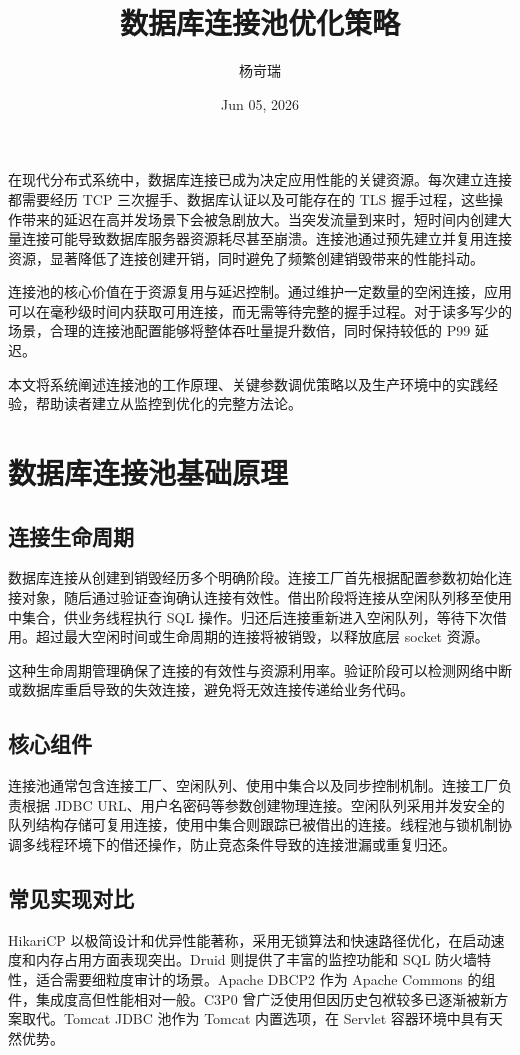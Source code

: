 \title{数据库连接池优化策略}
\author{杨岢瑞}
\date{Jun 05, 2026}
\maketitle
在现代分布式系统中，数据库连接已成为决定应用性能的关键资源。每次建立连接都需要经历 TCP 三次握手、数据库认证以及可能存在的 TLS 握手过程，这些操作带来的延迟在高并发场景下会被急剧放大。当突发流量到来时，短时间内创建大量连接可能导致数据库服务器资源耗尽甚至崩溃。连接池通过预先建立并复用连接资源，显著降低了连接创建开销，同时避免了频繁创建销毁带来的性能抖动。\par
连接池的核心价值在于资源复用与延迟控制。通过维护一定数量的空闲连接，应用可以在毫秒级时间内获取可用连接，而无需等待完整的握手过程。对于读多写少的场景，合理的连接池配置能够将整体吞吐量提升数倍，同时保持较低的 P99 延迟。\par
本文将系统阐述连接池的工作原理、关键参数调优策略以及生产环境中的实践经验，帮助读者建立从监控到优化的完整方法论。\par
\chapter{数据库连接池基础原理}
\section{连接生命周期}
数据库连接从创建到销毁经历多个明确阶段。连接工厂首先根据配置参数初始化连接对象，随后通过验证查询确认连接有效性。借出阶段将连接从空闲队列移至使用中集合，供业务线程执行 SQL 操作。归还后连接重新进入空闲队列，等待下次借用。超过最大空闲时间或生命周期的连接将被销毁，以释放底层 socket 资源。\par
这种生命周期管理确保了连接的有效性与资源利用率。验证阶段可以检测网络中断或数据库重启导致的失效连接，避免将无效连接传递给业务代码。\par
\section{核心组件}
连接池通常包含连接工厂、空闲队列、使用中集合以及同步控制机制。连接工厂负责根据 JDBC URL、用户名密码等参数创建物理连接。空闲队列采用并发安全的队列结构存储可复用连接，使用中集合则跟踪已被借出的连接。线程池与锁机制协调多线程环境下的借还操作，防止竞态条件导致的连接泄漏或重复归还。\par
\section{常见实现对比}
HikariCP 以极简设计和优异性能著称，采用无锁算法和快速路径优化，在启动速度和内存占用方面表现突出。Druid 则提供了丰富的监控功能和 SQL 防火墙特性，适合需要细粒度审计的场景。Apache DBCP2 作为 Apache Commons 的组件，集成度高但性能相对一般。C3P0 曾广泛使用但因历史包袱较多已逐渐被新方案取代。Tomcat JDBC 池作为 Tomcat 内置选项，在 Servlet 容器环境中具有天然优势。\par
